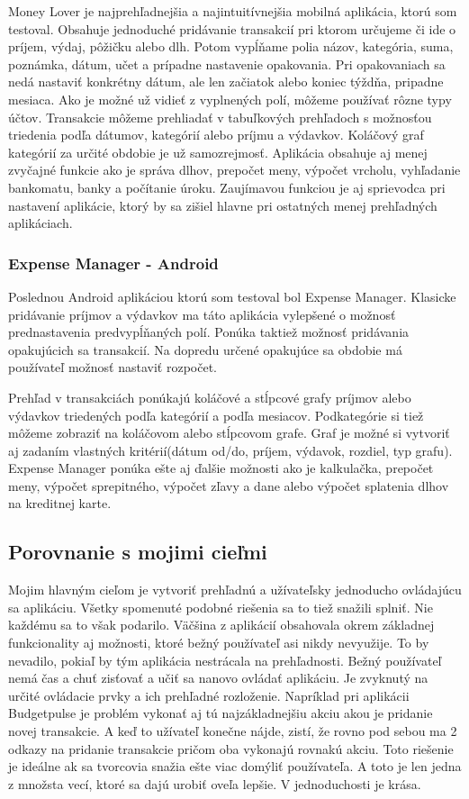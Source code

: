 \documentclass[12pt,oneside]{book}
\begin{document}
Money Lover je najprehľadnejšia a najintuitívnejšia mobilná aplikácia, ktorú som testoval. Obsahuje jednoduché pridávanie transakcií pri ktorom určujeme či ide o príjem, výdaj, pôžičku alebo dlh. Potom vypĺňame polia názov, kategória, suma, poznámka, dátum, učet a prípadne nastavenie opakovania. Pri opakovaniach sa nedá nastaviť konkrétny dátum, ale len začiatok alebo koniec týždňa, pripadne mesiaca. Ako je možné už vidieť z vyplnených polí, môžeme používať rôzne typy účtov. Transakcie môžeme prehliadať v tabuľkových prehľadoch s možnosťou triedenia podľa dátumov, kategórií alebo príjmu a výdavkov. Koláčový graf kategórií za určité obdobie je už samozrejmosť. Aplikácia obsahuje aj menej zvyčajné funkcie ako je správa dlhov, prepočet meny, výpočet vrcholu, vyhľadanie bankomatu, banky a počítanie úroku. Zaujímavou funkciou je aj sprievodca pri nastavení aplikácie, ktorý by sa zišiel hlavne pri ostatných menej prehľadných aplikáciach. 

\subsubsection{Expense Manager - Android \cite{ExpenseManager}\ }

Poslednou Android aplikáciou ktorú som testoval bol Expense Manager. Klasicke pridávanie príjmov a výdavkov ma táto aplikácia vylepšené o možnosť prednastavenia predvypĺňaných polí. Ponúka taktiež možnosť pridávania opakujúcich sa transakcií. Na dopredu určené opakujúce sa obdobie má používateľ možnosť nastaviť rozpočet. 

Prehľad v transakciách ponúkajú koláčové a stĺpcové grafy príjmov alebo výdavkov triedených podľa kategórií a podľa mesiacov. Podkategórie si tiež môžeme zobraziť na koláčovom alebo stĺpcovom grafe. Graf je možné si vytvoriť aj zadaním vlastných kritérií(dátum od/do, príjem, výdavok, rozdiel, typ grafu).
Expense Manager ponúka ešte aj ďalšie možnosti ako je kalkulačka, prepočet meny, výpočet sprepitného, výpočet zľavy a dane alebo výpočet splatenia dlhov na kreditnej karte.

\subsection{Porovnanie s mojimi cieľmi}
Mojim hlavným cieľom je vytvoriť prehľadnú a užívateľsky jednoducho ovládajúcu sa aplikáciu. Všetky spomenuté podobné riešenia sa to tiež snažili splniť. Nie každému sa to však podarilo. Väčšina z aplikácií obsahovala okrem základnej funkcionality aj možnosti, ktoré bežný používateľ asi nikdy nevyužije. To by nevadilo, pokiaľ by tým aplikácia nestrácala na prehľadnosti. Bežný používateľ nemá čas a chuť zisťovať a učiť sa nanovo ovládať aplikáciu. Je zvyknutý na určité ovládacie prvky a ich prehľadné rozloženie. Napríklad pri aplikácii Budgetpulse je problém vykonať aj tú najzákladnejšiu akciu akou je pridanie novej transakcie. A keď to užívateľ konečne nájde, zistí, že rovno pod sebou ma 2 odkazy na pridanie transakcie pričom oba vykonajú rovnakú akciu. Toto riešenie je ideálne ak sa tvorcovia snažia ešte viac domýliť používateľa. A toto je len jedna z množsta vecí, ktoré sa dajú urobiť oveľa lepšie. V jednoduchosti je krása.
\end{document}
